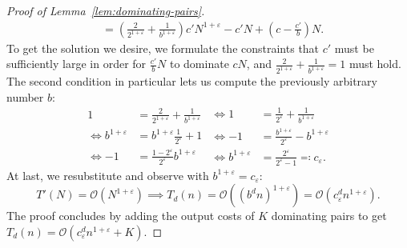 \begin{proof}[Proof of Lemma~\ref{lem:dominating-pairs}]
\begin{align*}
         &= \left( \frac{2}{2^{1 + \varepsilon}} + \frac{1}{b^{1 + \varepsilon}} \right) c' N^{1 + \varepsilon} - c' N + \left( c - \frac{c'}{b} \right) N.
    \end{align*}
    To get the solution we desire, we formulate the constraints that $c'$ must be sufficiently large in order for $\frac{c'}{b} N$ to dominate $c N$, and $\frac{2}{2^{1 + \varepsilon}} + \frac{1}{b^{1 + \varepsilon}} = 1$ must hold.
    The second condition in particular lets us compute the previously arbitrary number $b$:
    \[
        \begin{split}
            1 &= \frac{2}{2^{1 + \varepsilon}} + \frac{1}{b^{1 + \varepsilon}} \\
            \iff b^{1 + \varepsilon} &= b^{1 + \varepsilon} \frac{1}{2^\varepsilon} + 1 \\
            \iff -1 &= \frac{1 - 2^\varepsilon}{2^\varepsilon} b^{1 + \varepsilon}
        \end{split}
        \begin{split}
            \iff 1 &= \frac{1}{2^\varepsilon} + \frac{1}{b^{1 + \varepsilon}} \\
            \iff -1 &= \frac{b^{1 + \varepsilon}}{2^\varepsilon} - b^{1 + \varepsilon} \\
            \iff b^{1 + \varepsilon} &= \frac{2^\varepsilon}{2^\varepsilon - 1} \eqqcolon c_\varepsilon.
        \end{split}
    \]
    At last, we resubstitute and observe with $b^{1 + \varepsilon} = c_\varepsilon$:
    \[
        T'(N) = \mathcal{O}\left( N^{1 + \varepsilon} \right) \implies T_d(n) = \mathcal{O}\left( {\left( b^d n \right)}^{1 + \varepsilon} \right) = \mathcal{O}\left( c_\varepsilon^d n^{1 + \varepsilon} \right).
    \]
    The proof concludes by adding the output costs of $K$ dominating pairs to get $T_d(n) = \mathcal{O}\left( c_\varepsilon^d n^{1 + \varepsilon} + K \right)$.
\end{proof}
